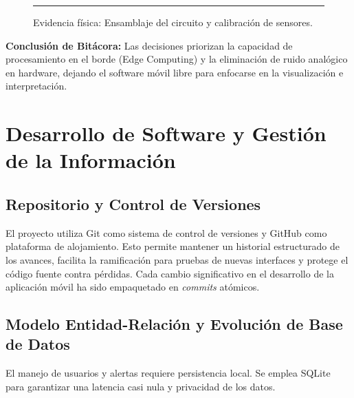\documentclass[11pt,a4paper]{article}
\begin{document}
\begin{figure}[htpb]
    \centering
    \rule{0.7\textwidth}{6cm} %
    \caption{Evidencia física: Ensamblaje del circuito y calibración de sensores.}
\end{figure}

\textbf{Conclusión de Bitácora:} Las decisiones priorizan la capacidad de procesamiento en el borde (Edge Computing) y la eliminación de ruido analógico en hardware, dejando el software móvil libre para enfocarse en la visualización e interpretación.

\section{Desarrollo de Software y Gestión de la Información}

\subsection{Repositorio y Control de Versiones}

El proyecto utiliza Git como sistema de control de versiones y GitHub como plataforma de alojamiento. Esto permite mantener un historial estructurado de los avances, facilita la ramificación para pruebas de nuevas interfaces y protege el código fuente contra pérdidas. Cada cambio significativo en el desarrollo de la aplicación móvil ha sido empaquetado en \textit{commits} atómicos.

\subsection{Modelo Entidad-Relación y Evolución de Base de Datos}

El manejo de usuarios y alertas requiere persistencia local. Se emplea SQLite para garantizar una latencia casi nula y privacidad de los datos.
\end{document}
